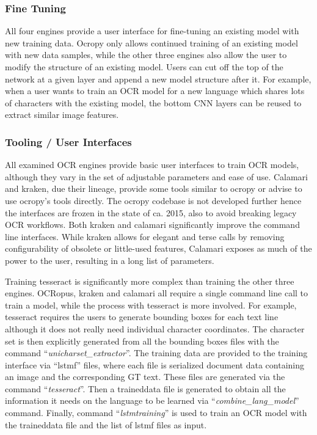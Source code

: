 \documentclass[conference]{IEEEtran}
\begin{document}
\subsubsection{Fine Tuning}

All four engines provide a user interface for fine-tuning an
existing model with new training data. Ocropy only allows
continued training of an existing model with new data samples,
while the other three engines also allow the user to modify the
structure of an existing model. Users can cut off the top of the 
network at a given layer and append a new model structure after it.
For example, when a user wants to train an OCR model for a new
language which shares lots of characters with the existing model,
the bottom CNN layers can be reused to extract similar image
features.


\subsubsection{Tooling / User Interfaces}

All examined OCR engines provide basic user interfaces to
train OCR models, although they vary in the set of adjustable
parameters and ease of use. Calamari and kraken, due their lineage,
provide some tools similar to ocropy or advise to use ocropy's tools
directly. The ocropy codebase is not developed further hence the interfaces
are frozen in the state of ca. 2015, also to avoid breaking legacy OCR
workflows. Both kraken and calamari significantly improve the command
line interfaces. While kraken allows for elegant and terse calls by
removing configurability of obsolete or little-used features, Calamari
exposes as much of the power to the user, resulting in a long list
of parameters.


Training tesseract is
significantly more complex than training the other three engines. OCRopus,
kraken and calamari all require a single command line call to train
a model, while the process with tesseract is more involved.
For example, tesseract requires the users
to generate bounding boxes for each text line although it does not
really need individual character coordinates. The character set is then
explicitly generated from all the bounding boxes files with the
command ``\textit{unicharset\_extractor}''. The training data are
provided to the training interface via ``lstmf'' files, where each
file is serialized document data containing an image and the
corresponding GT text. These files are generated via the
command ``\textit{tesseract}''. Then a traineddata file is generated
to obtain all the information it needs on the language to be
learned via ``\textit{combine\_lang\_model}'' command. Finally,
command ``\textit{lstmtraining}'' is used to train an OCR model with
the traineddata file and the list of lstmf files as input.
\end{document}
